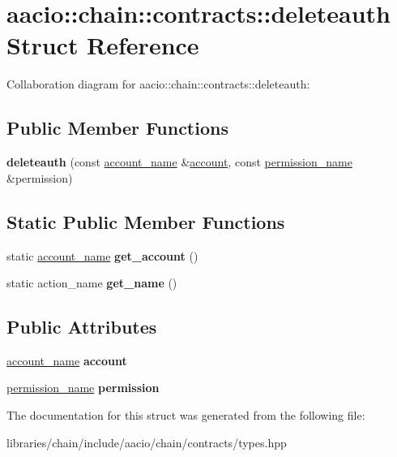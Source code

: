 \hypertarget{structaacio_1_1chain_1_1contracts_1_1deleteauth}{}\section{aacio\+:\+:chain\+:\+:contracts\+:\+:deleteauth Struct Reference}
\label{structaacio_1_1chain_1_1contracts_1_1deleteauth}


Collaboration diagram for aacio\+:\+:chain\+:\+:contracts\+:\+:deleteauth\+:
\subsection*{Public Member Functions}
\begin{DoxyCompactItemize}
\item 
\mbox{\label{structaacio_1_1chain_1_1contracts_1_1deleteauth_a81ef92a7599f5e79014d514ad6300188}} 
{\bfseries deleteauth} (const \mbox{\hyperlink{structaacio_1_1chain_1_1name}{account\+\_\+name}} \&\mbox{\hyperlink{structaccount}{account}}, const \mbox{\hyperlink{structaacio_1_1chain_1_1name}{permission\+\_\+name}} \&permission)
\end{DoxyCompactItemize}
\subsection*{Static Public Member Functions}
\begin{DoxyCompactItemize}
\item 
\mbox{\label{structaacio_1_1chain_1_1contracts_1_1deleteauth_a6e5372da25817dee85c371920a14629b}} 
static \mbox{\hyperlink{structaacio_1_1chain_1_1name}{account\+\_\+name}} {\bfseries get\+\_\+account} ()
\item 
\mbox{\label{structaacio_1_1chain_1_1contracts_1_1deleteauth_ae1a27fe093e83c282105df06e6bcdffa}} 
static action\+\_\+name {\bfseries get\+\_\+name} ()
\end{DoxyCompactItemize}
\subsection*{Public Attributes}
\begin{DoxyCompactItemize}
\item 
\mbox{\label{structaacio_1_1chain_1_1contracts_1_1deleteauth_af74ef12e9b9a9329b83f80f77eed1d46}} 
\mbox{\hyperlink{structaacio_1_1chain_1_1name}{account\+\_\+name}} {\bfseries account}
\item 
\mbox{\label{structaacio_1_1chain_1_1contracts_1_1deleteauth_a53e6fa7c93aa77311fa20ae7d91650c1}} 
\mbox{\hyperlink{structaacio_1_1chain_1_1name}{permission\+\_\+name}} {\bfseries permission}
\end{DoxyCompactItemize}


The documentation for this struct was generated from the following file\+:\begin{DoxyCompactItemize}
\item 
libraries/chain/include/aacio/chain/contracts/types.\+hpp\end{DoxyCompactItemize}
